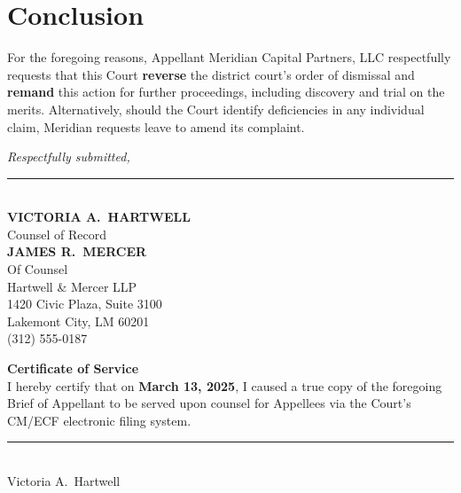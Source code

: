 \documentclass[12pt]{article}
\begin{document}
\section{Conclusion}

For the foregoing reasons, Appellant Meridian Capital Partners, LLC respectfully
requests that this Court \textbf{reverse} the district court's order of dismissal and
\textbf{remand} this action for further proceedings, including discovery and trial on
the merits. Alternatively, should the Court identify deficiencies in any individual
claim, Meridian requests leave to amend its complaint.

\vspace{24pt}

\noindent\begin{minipage}[t]{0.45\linewidth}
  \textit{Respectfully submitted,}\\[20pt]
  \noindent\rule{0.85\linewidth}{0.6pt}\\[2pt]
  {\bfseries\color{NavyDeep} VICTORIA A.\ HARTWELL}\\
  {\small\color{SlateGrey} Counsel of Record}\\[6pt]
  {\bfseries\color{NavyDeep} JAMES R.\ MERCER}\\
  {\small\color{SlateGrey} Of Counsel}\\[8pt]
  {\color{SlateGrey}\small Hartwell \& Mercer LLP\\
  1420 Civic Plaza, Suite 3100\\
  Lakemont City, LM 60201\\
  (312) 555-0187}
\end{minipage}
\hfill
\begin{minipage}[t]{0.45\linewidth}
  \vspace{6pt}
  \begin{tcolorbox}[
    enhanced,
    colback=IvoryBg,
    colframe=GoldAccent,
    arc=2pt,
    boxrule=0.6pt,
    left=8pt, right=8pt, top=8pt, bottom=8pt
  ]
    {\small\color{NavyDeep}\bfseries Certificate of Service}\\[4pt]
    {\small\color{SlateGrey}
    I hereby certify that on \textbf{March 13, 2025}, I caused a true copy of
    the foregoing Brief of Appellant to be served upon counsel for Appellees
    via the Court's CM/ECF electronic filing system.}\\[6pt]
    {\small\color{SlateGrey}\rule{0.6\linewidth}{0.5pt}}\\
    {\small\color{SlateGrey} Victoria A.\ Hartwell}
  \end{tcolorbox}
\end{minipage}
\end{document}
